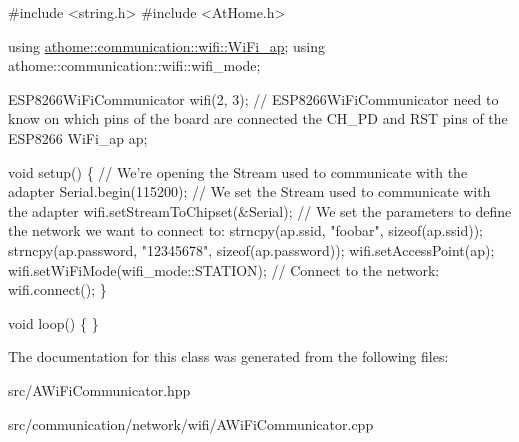 \begin{DoxyCode}
\textcolor{preprocessor}{#include <string.h>}
\textcolor{preprocessor}{#include <AtHome.h>}

\textcolor{keyword}{using} \mbox{\hyperlink{structathome_1_1communication_1_1wifi_1_1s__wifi__access__point}{athome::communication::wifi::WiFi\_ap}};
\textcolor{keyword}{using} athome::communication::wifi::wifi\_mode;

ESP8266WiFiCommunicator wifi(2, 3); \textcolor{comment}{// ESP8266WiFiCommunicator need to know}
on which pins of the board are connected the CH\_PD and RST pins of the
ESP8266 WiFi\_ap ap;

\textcolor{keywordtype}{void} setup() \{
  \textcolor{comment}{// We're opening the Stream used to communicate with the adapter}
  Serial.begin(115200);
  \textcolor{comment}{// We set the Stream used to communicate with the adapter}
  wifi.setStreamToChipset(&Serial);
  \textcolor{comment}{// We set the parameters to define the network we want to connect to:}
  strncpy(ap.ssid, \textcolor{stringliteral}{"foobar"}, \textcolor{keyword}{sizeof}(ap.ssid));
  strncpy(ap.password, \textcolor{stringliteral}{"12345678"}, \textcolor{keyword}{sizeof}(ap.password));
  wifi.setAccessPoint(ap);
  wifi.setWiFiMode(wifi\_mode::STATION);
  \textcolor{comment}{// Connect to the network:}
  wifi.connect();
\}

\textcolor{keywordtype}{void} loop() \{
\}
\end{DoxyCode}
 

The documentation for this class was generated from the following files\+:\begin{DoxyCompactItemize}
\item 
src/A\+Wi\+Fi\+Communicator.\+hpp\item 
src/communication/network/wifi/A\+Wi\+Fi\+Communicator.\+cpp\end{DoxyCompactItemize}
